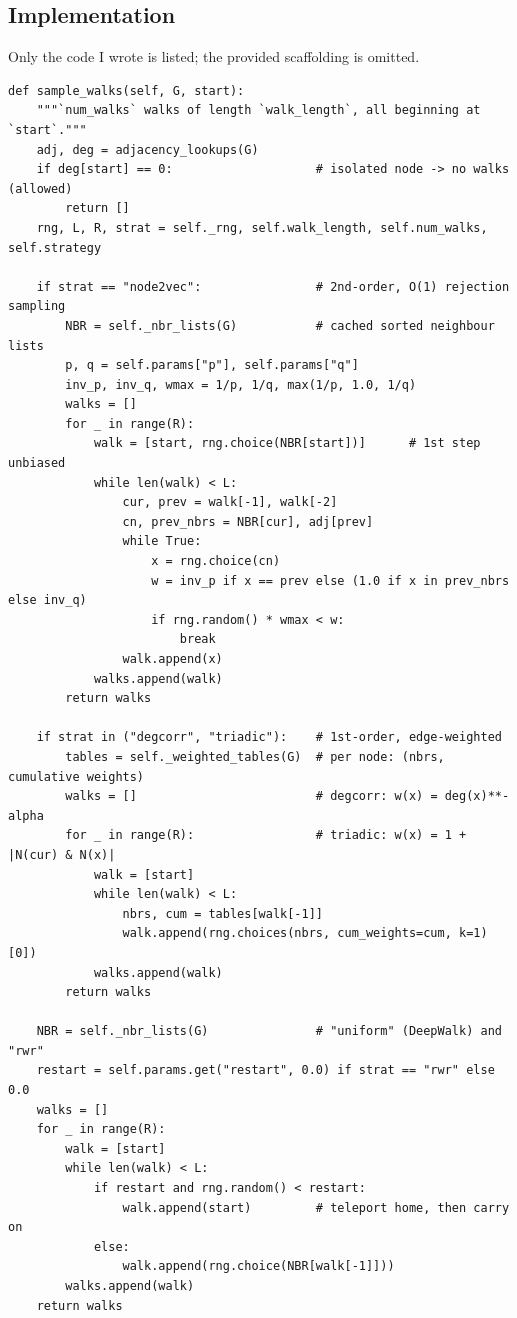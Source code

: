 \subsection{Implementation}
\label{p1:sec:code}

Only the code I wrote is listed; the provided scaffolding is omitted.


\begin{lstlisting}[style=p1code,caption={TODO 1 --- \texttt{sample\_walks}}]
def sample_walks(self, G, start):
    """`num_walks` walks of length `walk_length`, all beginning at `start`."""
    adj, deg = adjacency_lookups(G)
    if deg[start] == 0:                    # isolated node -> no walks (allowed)
        return []
    rng, L, R, strat = self._rng, self.walk_length, self.num_walks, self.strategy

    if strat == "node2vec":                # 2nd-order, O(1) rejection sampling
        NBR = self._nbr_lists(G)           # cached sorted neighbour lists
        p, q = self.params["p"], self.params["q"]
        inv_p, inv_q, wmax = 1/p, 1/q, max(1/p, 1.0, 1/q)
        walks = []
        for _ in range(R):
            walk = [start, rng.choice(NBR[start])]      # 1st step unbiased
            while len(walk) < L:
                cur, prev = walk[-1], walk[-2]
                cn, prev_nbrs = NBR[cur], adj[prev]
                while True:
                    x = rng.choice(cn)
                    w = inv_p if x == prev else (1.0 if x in prev_nbrs else inv_q)
                    if rng.random() * wmax < w:
                        break
                walk.append(x)
            walks.append(walk)
        return walks

    if strat in ("degcorr", "triadic"):    # 1st-order, edge-weighted
        tables = self._weighted_tables(G)  # per node: (nbrs, cumulative weights)
        walks = []                         # degcorr: w(x) = deg(x)**-alpha
        for _ in range(R):                 # triadic: w(x) = 1 + |N(cur) & N(x)|
            walk = [start]
            while len(walk) < L:
                nbrs, cum = tables[walk[-1]]
                walk.append(rng.choices(nbrs, cum_weights=cum, k=1)[0])
            walks.append(walk)
        return walks

    NBR = self._nbr_lists(G)               # "uniform" (DeepWalk) and "rwr"
    restart = self.params.get("restart", 0.0) if strat == "rwr" else 0.0
    walks = []
    for _ in range(R):
        walk = [start]
        while len(walk) < L:
            if restart and rng.random() < restart:
                walk.append(start)         # teleport home, then carry on
            else:
                walk.append(rng.choice(NBR[walk[-1]]))
        walks.append(walk)
    return walks
\end{lstlisting}

